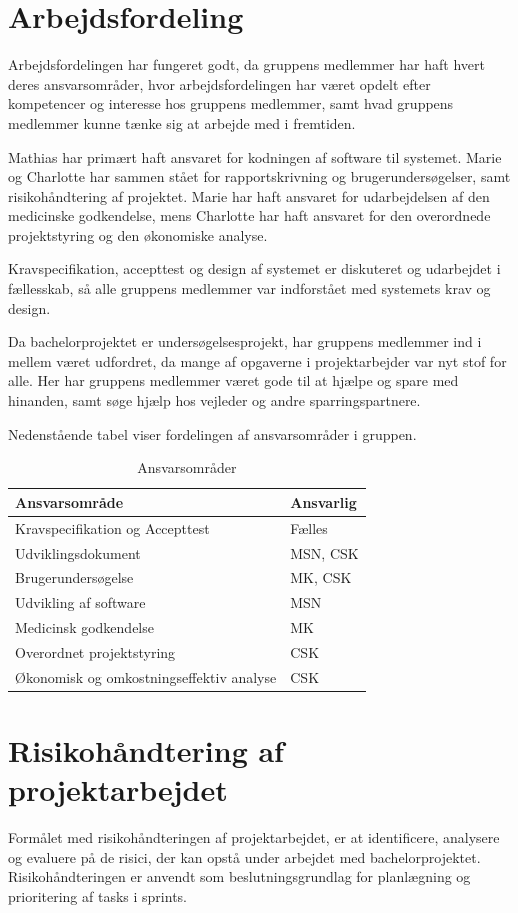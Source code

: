 \section{Arbejdsfordeling}
Arbejdsfordelingen har fungeret godt, da gruppens medlemmer har haft hvert deres ansvarsområder, hvor arbejdsfordelingen har været opdelt efter kompetencer og interesse hos gruppens medlemmer, samt hvad gruppens medlemmer kunne tænke sig at arbejde med i fremtiden.  

Mathias har primært haft ansvaret for kodningen af software til systemet. Marie og Charlotte har sammen stået for rapportskrivning og brugerundersøgelser, samt risikohåndtering af projektet. Marie har haft ansvaret for udarbejdelsen af den medicinske godkendelse, mens Charlotte har haft ansvaret for den overordnede projektstyring og den økonomiske analyse. 

Kravspecifikation, accepttest og design af systemet er diskuteret og udarbejdet i fællesskab, så alle gruppens medlemmer var indforstået med systemets krav og design. 

Da bachelorprojektet er undersøgelsesprojekt, har gruppens medlemmer ind i mellem været udfordret, da mange af opgaverne i projektarbejder var nyt stof for alle. Her har gruppens medlemmer været gode til at hjælpe og spare med hinanden, samt søge hjælp hos vejleder og andre sparringspartnere.  

Nedenstående tabel viser fordelingen af ansvarsområder i gruppen. 

\begin{table}[h]
\centering
\begin{tabular}{|l| p{}|}
\hline
\textbf{Ansvarsområde} &  \textbf{Ansvarlig} \\\hline
Kravspecifikation og Accepttest & Fælles \\\hline
Udviklingsdokument & MSN, CSK\\\hline
Brugerundersøgelse & MK, CSK \\\hline
Udvikling af software & MSN\\\hline
Medicinsk godkendelse & MK \\\hline
Overordnet projektstyring & CSK \\\hline
Økonomisk og omkostningseffektiv analyse & CSK \\\hline
\end{tabular}
\caption{Ansvarsområder}
\end{table}

\section{Risikohåndtering af projektarbejdet}
Formålet med risikohåndteringen af projektarbejdet, er at identificere, analysere og evaluere på de risici, der kan opstå under arbejdet med bachelorprojektet. Risikohåndteringen er anvendt som beslutningsgrundlag for planlægning og prioritering af tasks i sprints. 

